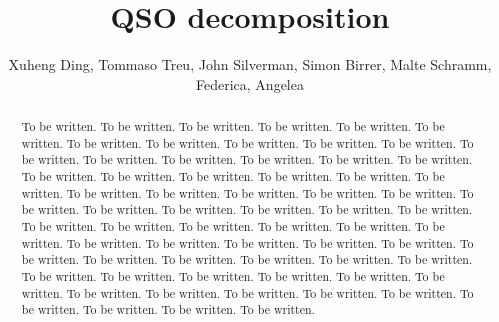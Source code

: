 \documentclass[apj]{emulateapj}
\begin{document}
\def\lcdm{$\Lambda$CDM}
\def\hst{{\it HST}}
\def\efr{$R_{\mathrm{eff}}$}
\def\galfit{\sc Galfit}
\def\mbh{$\mathcal M_{\rm BH}$}
\def\lhost{$L_{\rm host}$}
\def\jcap{Journal of Cosmology and Astroparticle Physics}
\def\halpha{${\it H}\alpha$}
\def\hbeta{${\it H}\beta$}
\def\sersic{S\'ersic}
\def\lenstronomy{{\sc Lenstronomy}}
\def\Reff{{$R_{\mathrm{eff}}$}}
\def\kms{km~s$^{\rm -1}$}
\def\sigstar{{$\sigma_*$}}
\def\smass{{$M_*$}}
\newcommand{\Mgii}{Mg$_{\rm II}$}
\newcommand{\Civ}{C$_{\rm IV}$}

\title{QSO decomposition}

\author{Xuheng Ding, Tommaso Treu, John Silverman, Simon Birrer, Malte Schramm, Federica, Angelea
 }


\begin{abstract}
To be written. To be written. To be written. To be written. To be written. To be written. To be written. To be written. To be written. To be written. To be written. To be written. To be written. To be written. To be written. To be written. To be written. To be written. To be written. To be written. To be written. To be written. To be written. To be written. To be written. To be written. To be written. To be written. To be written. To be written. To be written. To be written. To be written.  To be written. To be written. To be written. To be written. To be written. To be written. To be written. To be written. To be written. To be written. To be written. To be written. To be written. To be written. To be written. To be written. To be written. To be written. To be written. To be written. To be written. To be written. To be written. To be written. To be written. To be written. To be written. To be written. To be written. To be written. To be written. To be written. To be written. 
\end{abstract}
\end{document}
